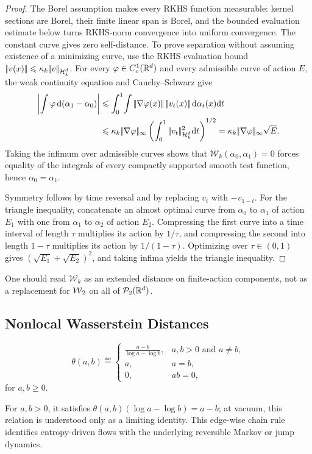 \begin{proof}
The Borel assumption makes every RKHS function measurable: kernel sections are Borel, their finite linear span is Borel, and the bounded evaluation estimate below turns RKHS-norm convergence into uniform convergence. The constant curve gives zero self-distance. To prove separation without assuming existence of a minimizing curve, use the RKHS evaluation bound
\(|\!| v(x) |\!|\leqslant \kappa_k|\!| v |\!|_{\mathcal{H}_k^d}\).
For every $\varphi\in C_c^1(\mathbb{R}^d)$ and every admissible curve of action $E$, the weak continuity equation and Cauchy--Schwarz give
\[
\begin{aligned}
\left|\int\varphi\,\d(\alpha_1-\alpha_0)\right|
&\leq
\int_0^1\!\int\norm{\nabla\varphi(x)}\,\norm{v_t(x)}\,\d\alpha_t(x)\d t\\
&\leq
\kappa_k\norm{\nabla\varphi}_\infty
\left(\int_0^1\norm{v_t}_{\RKHS_k^d}^2\d t\right)^{1/2}
=
\kappa_k\norm{\nabla\varphi}_\infty\sqrt E.
\end{aligned}
\]
Taking the infimum over admissible curves shows that $\mathcal W_k(\alpha_0,\alpha_1)=0$ forces equality of the integrals of every compactly supported smooth test function, hence $\alpha_0=\alpha_1$.

Symmetry follows by time reversal and by replacing \(v_t\) with \(-v_{1-t}\). For the triangle inequality, concatenate an almost optimal curve from \(\alpha_0\) to \(\alpha_1\) of action \(E_1\) with one from \(\alpha_1\) to \(\alpha_2\) of action \(E_2\). Compressing the first curve into a time interval of length \(\tau\) multiplies its action by \(1/\tau\), and compressing the second into length \(1-\tau\) multiplies its action by \(1/(1-\tau)\). Optimizing over \(\tau\in(0,1)\) gives \((\sqrt{E_1}+\sqrt{E_2})^2\), and taking infima yields the triangle inequality.
\end{proof}
One should read \(\mathcal W_k\) as an extended distance on finite-action components, not as a replacement for $\operatorname{\mathcal{W}}_2$ on all of $\mathcal{P}_2(\mathbb{R}^d)$.

\subsection{Nonlocal Wasserstein Distances}\label{sec-nonlocal-wasserstein-distances}
\begin{defn}\label{def-logarithmic-mean}
\begin{equation}\label{eq-logarithmic-mean}
\theta(a,b)\eqdef
\begin{cases}
\displaystyle\frac{a-b}{\log a-\log b}, & a,b>0\text{ and }a\neq b,\\[.4em]
a, & a=b,\\
0, & ab=0,
\end{cases}
\end{equation}
for $a,b\geq0$.
\end{defn}
For $a,b>0$, it satisfies \(\theta(a,b)(\log a-\log b)=a-b\); at vacuum, this relation is understood only as a limiting identity. This edge-wise chain rule identifies entropy-driven flows with the underlying reversible Markov or jump dynamics.

